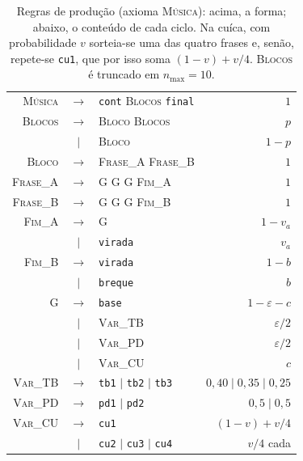 \documentclass{article}
\newcommand{\nt}[1]{\textsc{#1}}      %
\newcommand{\tm}[1]{\texttt{#1}}      %
\begin{document}
\begin{table}[t]
  \centering
  \footnotesize
  \renewcommand{\arraystretch}{0.9}
  \begin{tabular}{@{}r@{\;}c@{\;}l@{\qquad}r@{}}
    \toprule
    \nt{Música}   & $\to$  & \tm{cont} \nt{Blocos} \tm{final}  & $1$ \\
    \nt{Blocos}   & $\to$  & \nt{Bloco} \nt{Blocos}            & $p$ \\
                  & $\mid$ & \nt{Bloco}                        & $1-p$ \\
    \nt{Bloco}    & $\to$  & \nt{Frase\_A} \nt{Frase\_B}       & $1$ \\
    \nt{Frase\_A} & $\to$  & \nt{G} \nt{G} \nt{G} \nt{Fim\_A}  & $1$ \\
    \nt{Frase\_B} & $\to$  & \nt{G} \nt{G} \nt{G} \nt{Fim\_B}  & $1$ \\
    \nt{Fim\_A}   & $\to$  & \nt{G}                            & $1-v_a$ \\
                  & $\mid$ & \tm{virada}                       & $v_a$ \\
    \nt{Fim\_B}   & $\to$  & \tm{virada}                       & $1-b$ \\
                  & $\mid$ & \tm{breque}                       & $b$ \\
    \midrule
    \nt{G}        & $\to$  & \tm{base}                         & $1-\varepsilon-c$ \\
                  & $\mid$ & \nt{Var\_TB}                      & $\varepsilon/2$ \\
                  & $\mid$ & \nt{Var\_PD}                      & $\varepsilon/2$ \\
                  & $\mid$ & \nt{Var\_CU}                      & $c$ \\
    \nt{Var\_TB}  & $\to$  & \tm{tb1} $\mid$ \tm{tb2} $\mid$ \tm{tb3} & $0{,}40 \mid 0{,}35 \mid 0{,}25$ \\
    \nt{Var\_PD}  & $\to$  & \tm{pd1} $\mid$ \tm{pd2}          & $0{,}5 \mid 0{,}5$ \\
    \nt{Var\_CU}  & $\to$  & \tm{cu1}                          & $(1-v) + v/4$ \\
                  & $\mid$ & \tm{cu2} $\mid$ \tm{cu3} $\mid$ \tm{cu4} & $v/4$ cada \\
    \bottomrule
  \end{tabular}
  \caption{Regras de produção (axioma \nt{Música}): acima, a forma; abaixo, o conteúdo de
  cada ciclo. Na cuíca, com probabilidade $v$ sorteia-se uma das quatro frases e, senão,
  repete-se \tm{cu1}, que por isso soma $(1-v)+v/4$. \nt{Blocos} é truncado em
  $n_{\max}=10$.}
  \label{tab:gramatica}
\end{table}
\end{document}
